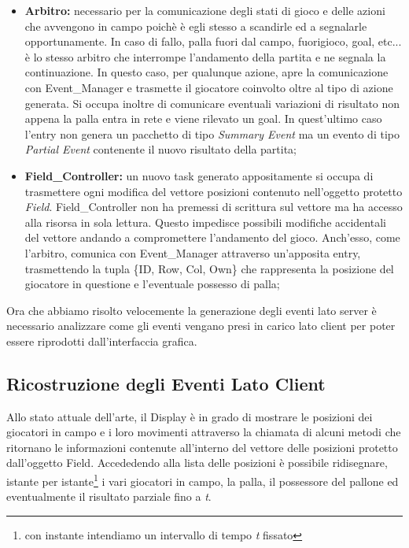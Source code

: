 \documentclass[aps,letterpaper,10pt]{article}
\begin{document}
\begin{itemize}
	\item \textbf{Arbitro:} necessario per la comunicazione degli stati di gioco e delle azioni che avvengono in campo poich\`e \`e egli stesso a scandirle ed a segnalarle opportunamente. In caso di fallo, palla fuori dal campo, fuorigioco, goal, etc... \`e lo stesso arbitro che interrompe l'andamento della partita e ne segnala la continuazione. In questo caso, per qualunque azione, apre la comunicazione con Event\_Manager e trasmette il giocatore coinvolto oltre al tipo di azione generata. Si occupa inoltre di comunicare eventuali variazioni di risultato non appena la palla entra in rete e viene rilevato un goal. In quest'ultimo caso l'entry non genera un pacchetto di tipo \emph{Summary Event} ma un evento di tipo \emph{Partial Event} contenente il nuovo risultato della partita;
	\item \textbf{Field\_Controller:} un nuovo task generato appositamente si occupa di trasmettere ogni modifica del vettore posizioni contenuto nell'oggetto protetto \emph{Field}. Field\_Controller non ha premessi di scrittura sul vettore ma ha accesso alla risorsa in sola lettura. Questo impedisce possibili modifiche accidentali del vettore andando a compromettere l'andamento del gioco. Anch'esso, come l'arbitro, comunica con Event\_Manager attraverso un'apposita entry, trasmettendo la tupla \{ID, Row, Col, Own\} che rappresenta la posizione del giocatore in questione e l'eventuale possesso di palla;
\end{itemize}

Ora che abbiamo risolto velocemente la generazione degli eventi lato server \`e necessario analizzare come gli eventi vengano presi in carico lato client per poter essere riprodotti dall'interfaccia grafica.


\subsection{Ricostruzione degli Eventi Lato Client} %
\label{sub:ricostruzione_degli_eventi_lato_client}

Allo stato attuale dell'arte, il Display \`e in grado di mostrare le posizioni dei giocatori in campo e i loro movimenti attraverso la chiamata di alcuni metodi che ritornano le informazioni contenute all'interno del vettore delle posizioni protetto dall'oggetto Field. Accededendo alla lista delle posizioni \`e possibile ridisegnare, istante per istante\footnote{con instante intendiamo un intervallo di tempo \emph{t} fissato} i vari giocatori in campo, la palla, il possessore del pallone ed eventualmente il risultato parziale fino a \emph{t}. \vspace{3mm}
\end{document}
